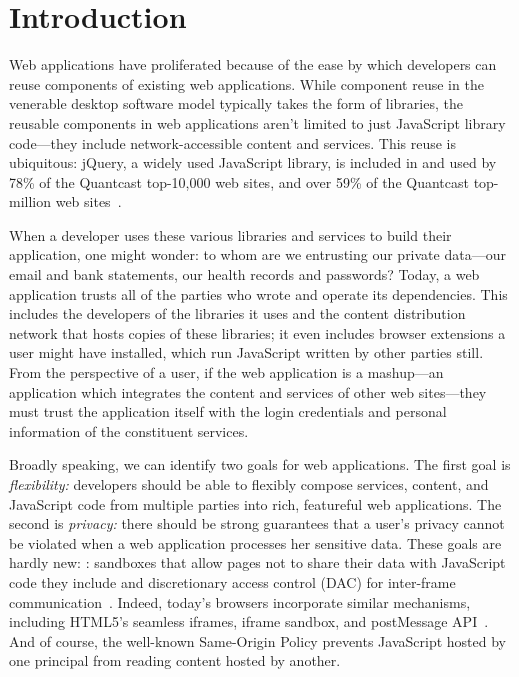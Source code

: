 \section{Introduction}
\label{sec:intro}

Web applications have proliferated because of the ease by which
developers can reuse components of existing web applications.
%
While component reuse in the venerable desktop software model typically
takes the form of libraries, the reusable components in web applications
aren't limited to just JavaScript library code---they include
network-accessible content and services.
%
This reuse is ubiquitous\@: jQuery, a widely used JavaScript
library, is included in and used by 78\% of the Quantcast top-10,000
web sites, and over 59\% of the Quantcast top-million web
sites~\cite{quantcast}.

When a developer uses these various libraries and services to build
their application, one might wonder: to whom are we entrusting our
private data---our email and bank statements, our health records and
passwords?
%
Today, a web application trusts all of the parties who wrote and
operate its dependencies.
%
This includes the developers of the libraries it uses and the content
distribution network that hosts copies of these libraries; it even
includes browser extensions a user might have installed, which run
JavaScript written by other parties still.
%
From the perspective of a user, if the web application is a mashup---an
application which integrates the content and services of other web
sites---they must trust the application itself with the login
credentials and personal information of the constituent services.

 Broadly speaking, we can identify two goals for web applications.
%
The first goal is {\em flexibility:\/} developers should be able to
flexibly compose services, content, and JavaScript code from multiple
parties into rich, featureful web applications.
%
The second is {\em privacy:\/} there should be strong guarantees that a
user's privacy cannot be violated when a web application processes her
sensitive data.
%
These goals are hardly new: :
sandboxes that allow pages not to share their data with JavaScript code
they include and discretionary access control (DAC) for inter-frame
communication~\cite{mashupos}.
%
Indeed, today's browsers incorporate similar mechanisms, including
HTML5's seamless iframes, iframe sandbox, and postMessage
API~\cite{html5}.
%
And of course, the well-known Same-Origin Policy prevents JavaScript
hosted by one principal from reading content hosted by another.

